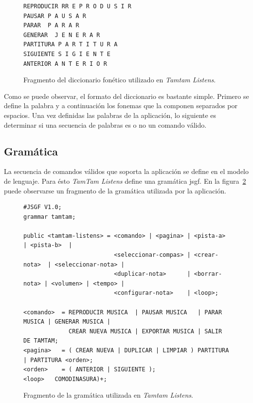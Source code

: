 \lstset{
  basicstyle=\scriptsize,        %
  breakatwhitespace=false,         %
  frame=single,                    %
  language=Octave,                 %
  numbersep=5pt,                   %
  showstringspaces=false,          %
  stepnumber=2,                    %
  tabsize=2                       %
}

\begin{figure}[H]
\begin{lstlisting}
REPRODUCIR RR E P R O D U S I R
PAUSAR P A U S A R
PARAR  P A R A R
GENERAR  J E N E R A R
PARTITURA P A R T I T U R A
SIGUIENTE S I G I E N T E
ANTERIOR A N T E R I O R
\end{lstlisting}
\caption{Fragmento del diccionario fon\'etico utilizado en \emph{Tamtam Listens}.}
\label{figure:fragmento-dic}
\end{figure}

Como se puede observar, el formato del diccionario es bastante simple. Primero se define la palabra y 
a continuaci\'on los fonemas que la componen separados por espacios.
Una vez definidas las palabras de la aplicaci\'on, lo siguiente es determinar si una secuencia de palabras es o no un 
comando v\'alido.

\subsection{Gram\'atica}

La secuencia de comandos v\'alidos que soporta la aplicaci\'on se define en el modelo de lenguaje. Para \'esto
\emph{TamTam Listens} define una gram\'atica \gls{jsgf}. En la figura~\ref{figure:fragmento-gram} 
puede observarse un fragmento de la gram\'atica utilizada por la aplicaci\'on.

\begin{figure}[H]
\begin{lstlisting}
#JSGF V1.0;
grammar tamtam;

public <tamtam-listens> = <comando> | <pagina> | <pista-a>     | <pista-b>  | 
                          <seleccionar-compas> | <crear-nota>  | <seleccionar-nota> | 
                          <duplicar-nota>      | <borrar-nota> | <volumen> | <tempo> | 
                          <configurar-nota>    | <loop>;

<comando>  = REPRODUCIR MUSICA  | PAUSAR MUSICA   | PARAR MUSICA | GENERAR MUSICA | 
             CREAR NUEVA MUSICA | EXPORTAR MUSICA | SALIR DE TAMTAM;
<pagina>   = ( CREAR NUEVA | DUPLICAR | LIMPIAR ) PARTITURA | PARTITURA <orden>;
<orden>    = ( ANTERIOR | SIGUIENTE );
<loop>   COMODINASURA)+;
\end{lstlisting}
\caption{Fragmento de la gram\'atica utilizada en \emph{Tamtam Listens}.}
\label{figure:fragmento-gram}
\end{figure} 

